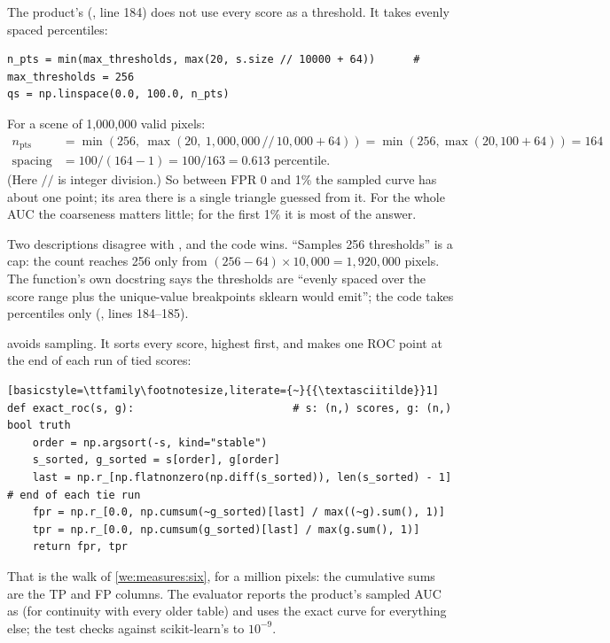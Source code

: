 The product's  (, line 184) does not use every score
as a threshold. It takes evenly spaced percentiles:
\begin{lstlisting}
n_pts = min(max_thresholds, max(20, s.size // 10000 + 64))      # max_thresholds = 256
qs = np.linspace(0.0, 100.0, n_pts)
\end{lstlisting}
For a scene of 1,000,000 valid pixels:
\begin{align*}
n_{\text{pts}} &= \min(256,\ \max(20,\ 1{,}000{,}000 \,/\!/\, 10{,}000 + 64)) = \min(256, \max(20, 100 + 64)) = 164\\
\text{spacing} &= 100 / (164 - 1) = 100 / 163 = 0.613 \text{ percentile.}
\end{align*}
(Here $/\!/$ is integer division.) So between FPR 0 and 1\% the sampled curve has about one point; its area there is
a single triangle guessed from it. For the whole AUC the coarseness matters little; for the first 1\% it is most of
the answer.

\begin{sourcenote}
Two descriptions disagree with , and the code wins. ``Samples 256 thresholds'' is a cap: the
count reaches 256 only from $(256 - 64) \times 10{,}000 = 1{,}920{,}000$ pixels. The function's own docstring says
the thresholds are ``evenly spaced over the score range plus the unique-value breakpoints sklearn would emit''; the
code takes percentiles only (, lines 184--185).
\end{sourcenote}

 avoids sampling. It sorts every score, highest first, and makes one ROC point at the end of each run
of tied scores:
\begin{lstlisting}[basicstyle=\ttfamily\footnotesize,literate={~}{{\textasciitilde}}1]
def exact_roc(s, g):                         # s: (n,) scores, g: (n,) bool truth
    order = np.argsort(-s, kind="stable")
    s_sorted, g_sorted = s[order], g[order]
    last = np.r_[np.flatnonzero(np.diff(s_sorted)), len(s_sorted) - 1]   # end of each tie run
    fpr = np.r_[0.0, np.cumsum(~g_sorted)[last] / max((~g).sum(), 1)]
    tpr = np.r_[0.0, np.cumsum(g_sorted)[last] / max(g.sum(), 1)]
    return fpr, tpr
\end{lstlisting}
That is the walk of \cref{we:measures:six}, for a million pixels: the cumulative sums are the TP and FP columns.
The evaluator reports the product's sampled AUC as  (for continuity with every older table) and uses
the exact curve for everything else; the test checks  against scikit-learn's 
to $10^{-9}$.

